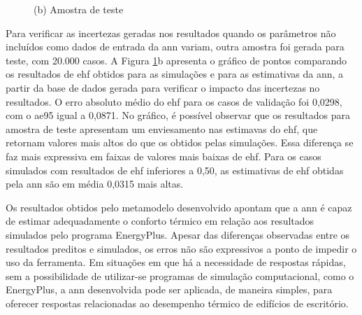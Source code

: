 \begin{figure}[h]
\begin{minipage}{.5\textwidth}
		\begin{center}
			\small{(b) Amostra de teste}
		\end{center}
	\end{minipage}
	\label{fig:ann_validation}
\end{figure}


Para verificar as incertezas geradas nos resultados quando os parâmetros não incluídos como dados de entrada da \acrshort{ann} variam, outra amostra foi gerada para teste, com 20.000 casos.
A Figura \ref{fig:ann_validation}b apresenta o gráfico de pontos comparando os resultados de \acrshort{ehf} obtidos para as simulações e para as estimativas da \acrshort{ann}, a partir da base de dados gerada para verificar o impacto das incertezas no resultados. O erro absoluto médio do \acrshort{ehf} para os casos de validação foi 0,0298, com o \acrshort{ae95} igual a 0,0871.
No gráfico, é possível observar que os resultados para amostra de teste apresentam um enviesamento nas estimavas do \acrshort{ehf}, que retornam valores mais altos do que os obtidos pelas simulações. Essa diferença se faz mais expressiva em faixas de valores mais baixas de \acrshort{ehf}. Para os casos simulados com resultados de \acrshort{ehf} inferiores a 0,50, as estimativas de \acrshort{ehf} obtidas pela \acrshort{ann} são em média 0,0315 mais altas.

Os resultados obtidos pelo metamodelo desenvolvido apontam que a \acrshort{ann} é capaz de estimar adequadamente o conforto térmico em relação aos resultados simulados pelo programa EnergyPlus. 
Apesar das diferenças observadas entre os resultados preditos e simulados, os erros não são expressivos a ponto de impedir o uso da ferramenta.
Em situações em que há a necessidade de respostas rápidas, sem a possibilidade de utilizar-se programas de simulação computacional, como o EnergyPlus, a \acrshort{ann} desenvolvida pode ser aplicada, de maneira simples, para oferecer respostas relacionadas ao desempenho térmico de edifícios de escritório.

